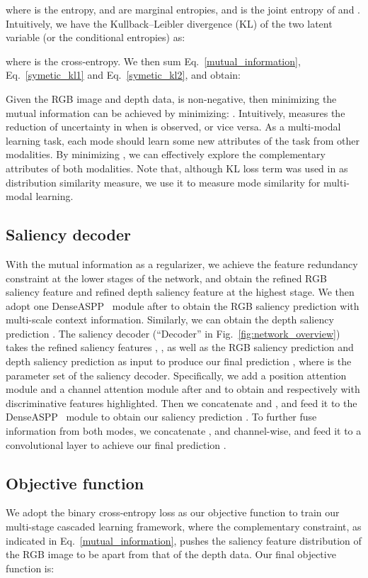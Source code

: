 \documentclass[10pt,twocolumn,letterpaper]{article}
\begin{document}
where  is the entropy,  and  are marginal entropies, and  is the joint entropy of  and . Intuitively, we have the Kullback–Leibler divergence (KL) of the two latent variable (or the conditional entropies) as:


where  is the cross-entropy.
We then sum Eq.~\ref{mutual_information}, Eq.~\ref{symetic_kl1} and Eq.~\ref{symetic_kl2}, and obtain:


Given the RGB image and depth data,  is non-negative, then
minimizing the mutual information can be achieved by minimizing:
.
Intuitively,
 measures the reduction of uncertainty in  when  is observed, or vice versa. As a multi-modal learning task, each mode should learn some new attributes of the task from other modalities. By minimizing , we can effectively explore the complementary attributes of both modalities.
Note that, although KL loss term was used in \cite{jing2020uc} as distribution similarity measure,
we use it to measure mode similarity for multi-modal learning.




\subsection{Saliency decoder}
With the mutual information as a regularizer, we achieve the feature redundancy constraint at the lower stages of the network, and obtain the refined RGB saliency feature  and refined depth saliency feature  at the highest stage. We then adopt one DenseASPP~\cite{denseaspp} module after  to obtain the RGB saliency prediction  with multi-scale context information. Similarly, we can obtain the depth saliency prediction .
The saliency decoder  (\enquote{Decoder} in Fig.~\ref{fig:network_overview}) takes the refined saliency features , , as well as the RGB saliency prediction  and depth saliency prediction  as input to produce our final prediction , where  is the parameter set of the saliency decoder.
Specifically,
we add a position attention module and a channel attention module \cite{fu2019dual} after  and  to obtain  and  respectively with discriminative features highlighted.
Then we concatenate  and , and
feed it to the DenseASPP~\cite{denseaspp} module to obtain our saliency prediction . To further fuse information from both modes, we concatenate ,  and  channel-wise, and feed it to a  convolutional layer
to achieve our final prediction .

\subsection{Objective function}
\label{obj_fun_sec}
We adopt the binary cross-entropy loss  as our objective function to train our multi-stage cascaded learning framework,
where the complementary constraint, as indicated in Eq.~\eqref{mutual_information}, pushes the saliency feature distribution of the RGB image to be apart from that of the depth data.
Our final objective function is:
\end{document}
